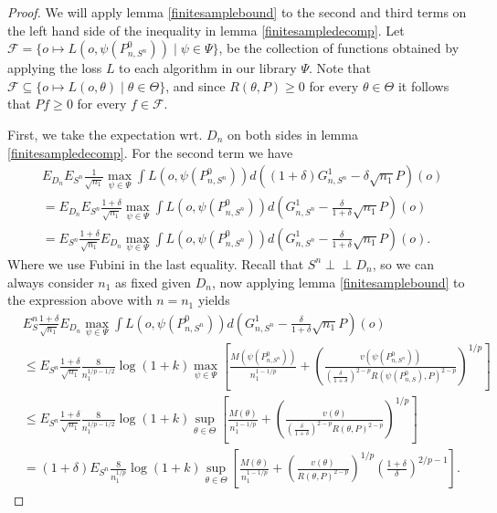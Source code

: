 \documentclass[11pt, a4paper]{article}
\newcommand{\indep}{\perp \!\!\! \perp}
\theoremstyle{definition}
\theoremstyle{remark}
\newcommand{\btheta}{\theta}
\newcommand{\la}{\psi}
\newcommand{\Sn}{S^n}
\newcommand{\lib}{\Psi}
\begin{document}
\begin{proof}[Proof]
    We will apply lemma \ref{finitesamplebound} to the second and third terms on the left hand side of the inequality in lemma \ref{finitesampledecomp}. Let $ \mathcal{F} = \{o \mapsto L(o, \la(P_{n,\Sn}^{0})) \mid \la \in \lib\}$, be the collection of functions obtained by applying the loss $ L $ to each algorithm in our library $ \lib$. Note that $ \mathcal{F} \subseteq \{o \mapsto L(o, \btheta) \mid \btheta \in \Theta\} $, and since $ R(\btheta, P) \geq 0 $ for every $ \btheta \in \Theta $ it follows that $ Pf \geq 0 $ for every $ f \in \mathcal{F} $.

First, we take the expectation wrt. $ D_n $ on both sides in lemma \ref{finitesampledecomp}. For the second term we have 
\begin{align*}
&E_{D_n} E_{\Sn} \frac{1}{\sqrt{n_1} } \max_{\la \in \lib} \int L(o, \la(P_{n, \Sn}^{0})) d ((1 + \delta) G_{n,\Sn}^{1} - \delta \sqrt{n_1} P)(o)\\
&= 
E_{D_n}E_{\Sn} \frac{1 + \delta}{\sqrt{n_1} } \max_{\la \in \lib} \int L(o, \la(P_{n, \Sn}^{0})) d (G_{n,\Sn}^{1} - \frac{\delta }{1 + \delta} \sqrt{n_1} P)(o)\\
&=E_{\Sn} \frac{1 + \delta}{\sqrt{n_1} } E_{D_n}\max_{\la \in \lib} \int L(o, \la(P_{n, \Sn}^{0})) d (G_{n,\Sn}^{1} - \frac{\delta }{1 + \delta} \sqrt{n_1} P)(o).
\end{align*}
Where we use Fubini in the last equality. Recall that $ \Sn \indep D_n $, so we can always consider $ n_1 $ as fixed given $ D_n $, now applying lemma \ref{finitesamplebound} to the expression above with $ n = n_1 $ yields 
\begin{align*}
&E_\Sn\frac{1 + \delta}{\sqrt{n_1} } E_{D_n} \max_{\la \in \lib} \int L(o, \la(P_{n, \Sn}^{0})) d (G_{n,\Sn}^{1} - \frac{\delta }{1 + \delta} \sqrt{n_1} P)(o) \\
&\leq E_{\Sn} \frac{1 + \delta}{\sqrt{n_1}} \frac{8}{n_1^{1/p-1/2}} \log(1 + k) \max_{\la \in \lib} \left[ \frac{M(\la(P_{n,\Sn}^{0}))}{n_1^{1-1/p}} + \left( \frac{v(\la(P_{n,\Sn}^0) )}{( \frac{\delta}{1 + \delta} )^{2-p} R(\la(P_{n,S}^{0}), P)^{2-p}} \right)^{1/p} \right] \\
&\leq E_{\Sn}\frac{1 + \delta}{\sqrt{n_1}} \frac{8}{n_1^{1/p-1/2}} \log(1 + k) \sup_{\btheta \in \Theta} \left[ \frac{M(\btheta)}{n_1^{1-1/p}} + \left( \frac{v(\btheta)}{( \frac{\delta}{1 + \delta} )^{2-p} R(\btheta,P)^{2-p}} \right)^{1/p} \right] \\
&= (1 + \delta) E_{\Sn}\frac{8}{n_1^{1/p}} \log(1 + k) \sup_{\btheta \in \Theta} \left[ \frac{M(\btheta)}{n_1^{1-1/p}} + \left( \frac{v(\btheta)}{R(\btheta,P)^{2-p}} \right)^{1/p}\left( \frac{1 + \delta}{\delta}  \right)^{2/p-1} \right].  

\end{align*}
\end{proof}
\end{document}
